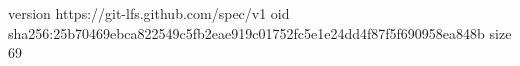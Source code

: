 version https://git-lfs.github.com/spec/v1
oid sha256:25b70469ebca822549c5fb2eae919c01752fc5e1e24dd4f87f5f690958ea848b
size 69
